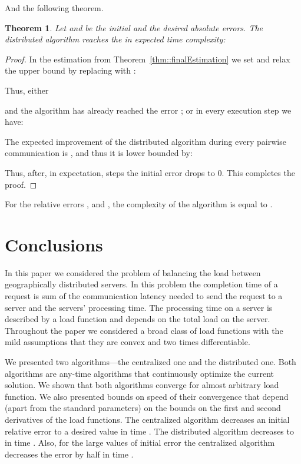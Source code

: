 \documentclass[11pt]{article}
\newtheorem{theorem}{Theorem}
\begin{document}
And the following theorem.

\begin{theorem}\label{thm::convergence}
Let  and  be the initial and the desired absolute errors. The distributed algorithm reaches the  in expected time complexity:

\end{theorem}
\begin{proof}
In the estimation from Theorem~\ref{thm::finalEstimation} we set  and relax the upper bound by replacing  with :

Thus, either

and the algorithm has already reached the error ; or in every execution step we have:

The expected improvement of the distributed algorithm during every pairwise communication is , and thus it is lower bounded by:

Thus, after, in expectation,  steps the initial error drops to 0.
This completes the proof.
\end{proof}

For the relative errors , and , the complexity of the algorithm is equal to .

\section{Conclusions}

In this paper we considered the problem of balancing the load between geographically distributed servers. In this problem the completion time of a request is sum of the 
communication latency needed to send the request to a server and the servers' processing time. The processing time on a server is described by a load function and depends on the total load on the server. Throughout the paper we considered a broad class of load functions with  the mild assumptions that they are convex and two times differentiable. 

We presented two algorithms---the centralized one and the distributed one. Both algorithms are any-time algorithms that continuously optimize the current solution. We shown that both algorithms converge for almost arbitrary load function. We also presented bounds on speed of their convergence that depend (apart from the standard parameters) on the bounds on the first and second derivatives of the load functions. The centralized algorithm decreases an initial relative error  to a desired value   in time . The distributed algorithm decreases  to  in time . Also, for the large values of initial error  the centralized algorithm decreases the error by half in time .
\end{document}
